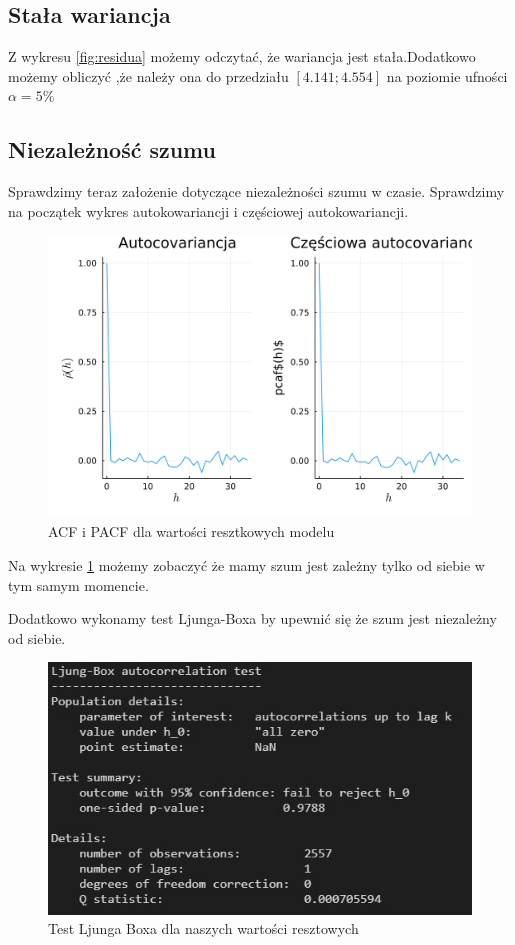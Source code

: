 \documentclass[12pt]{article}
\theoremstyle{exer}
\begin{document}
\subsection{Stała wariancja}
Z wykresu \ref{fig:residua} możemy odczytać, że wariancja jest stała.Dodatkowo możemy obliczyć ,że  należy ona do przedziału $[4.141 ; 4.554]$ na poziomie ufności $\alpha = 5\%$

\subsection{Niezależność szumu}
Sprawdzimy teraz założenie dotyczące niezależności szumu w czasie. Sprawdzimy na początek wykres autokowariancji i częściowej autokowariancji. 
\begin{figure}[H]
	\centering
	\includegraphics[width=3\columnwidth/4]{img/acf_pacf_residua.png}
	\caption{ACF i PACF dla wartości resztkowych modelu}
	\label{fig:residua_acf_pacf}
\end{figure}
Na wykresie \ref{fig:residua_acf_pacf} możemy  zobaczyć że mamy szum jest zależny tylko od siebie w tym samym momencie.

Dodatkowo wykonamy test Ljunga-Boxa by upewnić się że szum jest niezależny od siebie.
\begin{figure}[H]
	\centering
	\includegraphics[width=3\columnwidth/4]{img/Ljung-Box.png}
	\caption{Test Ljunga Boxa dla naszych wartości resztowych}
	\label{Test Ljunga Boxa}
\end{figure}
\end{document}
